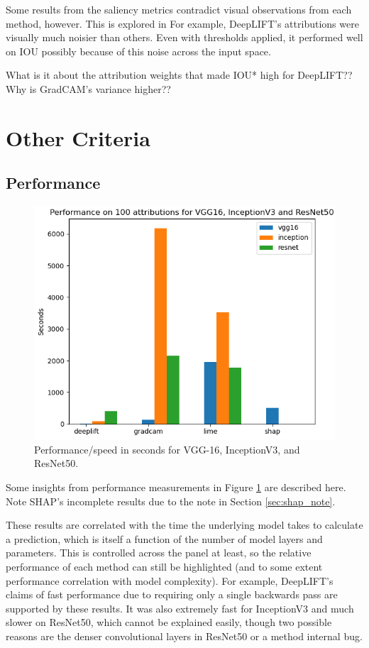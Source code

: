 \documentclass[main]{subfiles}
\begin{document}
Some results from the saliency metrics contradict visual observations from each method, however. This is explored in  For example, DeepLIFT's attributions were visually much noisier than others. Even with thresholds applied, it performed well on IOU possibly because of this noise across the input space.



What is it about the attribution weights that made IOU* high for DeepLIFT?? Why is GradCAM's variance higher??

\newpage
\section{Other Criteria}
\subsection{Performance} \label{sec:perform}


\begin{figure}[h]\centering
\vfill
\includegraphics[scale=0.6]{performance.png}
\caption{Performance/speed in seconds for VGG-16, InceptionV3, and ResNet50. }
\label{performFig}
\vfill
\end{figure}

Some insights from performance measurements in Figure \ref{performFig} are described here. Note SHAP's incomplete results due to the note in Section \ref{sec:shap_note}.

These results are correlated with the time the underlying model takes to calculate a prediction, which is itself a function of the number of model layers and parameters. This is controlled across the panel at least, so the relative performance of each method can still be highlighted (and to some extent performance correlation with model complexity). For example, DeepLIFT's claims of fast performance due to requiring only a single backwards pass are supported by these results. It was also extremely fast for InceptionV3 and much slower on ResNet50, which cannot be explained easily, though two possible reasons are the denser convolutional layers in ResNet50 or a method internal bug.
\end{document}

